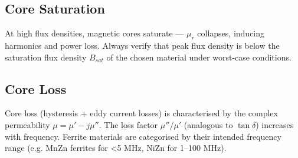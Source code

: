 				

\subsection{Core Saturation}

				

At high flux densities, magnetic cores saturate — $\mu_r$ collapses, inducing harmonics and power loss. Always verify that peak flux density is below the saturation flux density $B_{sat}$ of the chosen material under worst-case conditions.

				

\subsection{Core Loss}

				


				

Core loss (hysteresis + eddy current losses) is characterised by the complex permeability $\mu = \mu' - j\mu''$. The loss factor $\mu''/\mu'$ (analogous to $\tan\delta$) increases with frequency. Ferrite materials are categorised by their intended frequency range (e.g. MnZn ferrites for \textless{}5 MHz, NiZn for 1–100 MHz).



